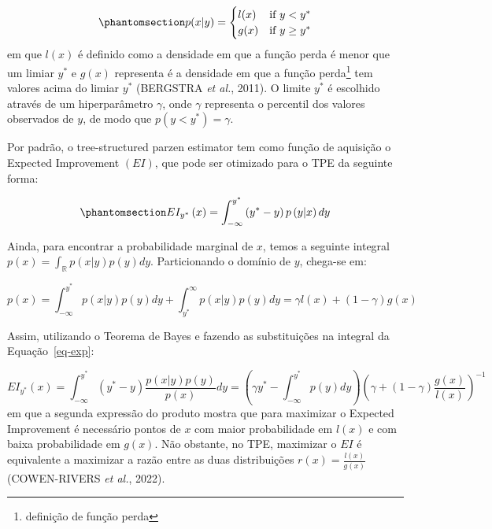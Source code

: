 \documentclass[
  12pt,
  letterpaper,
  DIV=11,
  numbers=noendperiod]{scrreprt}
\begin{document}
\begin{equation}\phantomsection\label{eq-tpe}{
p(x|y) =
\begin{cases}
    l(x) & \text{if } y < y^* \\
    g(x) & \text{if } y \ge y^*
\end{cases}
}\end{equation} em que \(l\left(x\right)\) é definido como a densidade
em que a função perda é menor que um limiar \(y^*\) e
\(g\left(x\right)\) representa é a densidade em que a função
perda\footnote{definição de função perda} tem valores acima do limiar
\(y^*\) (BERGSTRA \emph{et al.}, 2011). O limite \(y^*\) é escolhido
através de um hiperparâmetro \(\gamma\), onde \(\gamma\) representa o
percentil dos valores observados de \(y\), de modo que
\(p\left(y < y^*\right) = \gamma\).

\vspace{12pt}

Por padrão, o tree-structured parzen estimator tem como função de
aquisição o Expected Improvement \(\left(EI\right)\), que pode ser
otimizado para o TPE da seguinte forma:

\begin{equation}\phantomsection\label{eq-exp}{
  EI_{y^*}\left(x\right) = \int_{-\infty}^{y^*} \left(y^* - y\right)p\left(y | x\right) dy
}\end{equation}

Ainda, para encontrar a probabilidade marginal de \(x\), temos a
seguinte integral
\(p\left(x\right) = \int_{\mathbb{R}} p\left(x | y\right)p\left(y\right)dy\).
Particionando o domínio de \(y\), chega-se em:

\[
p\left(x\right) = \int_{-\infty}^{y^*} p\left(x | y\right)p\left(y\right)dy + \int_{y^*}^{\infty} p\left(x | y\right)p\left(y\right)dy = \gamma l\left(x\right) + \left(1 - \gamma \right) g\left(x\right)
\]

Assim, utilizando o Teorema de Bayes e fazendo as substituições na
integral da Equação~\ref{eq-exp}:

\[
EI_{y^*}\left(x\right) = \int_{-\infty}^{y^*} \left(y^* - y\right) \frac{p\left(x | y\right)p\left(y\right)}{p\left(x\right)}dy = \left(\gamma y^*  - \int_{-\infty}^{y^*} p\left(y\right)dy\right) \left(\gamma + \left(1 - \gamma\right)\frac{g\left(x\right)}{l\left(x\right)}\right) ^{-1}
\] em que a segunda expressão do produto mostra que para maximizar o
Expected Improvement é necessário pontos de \(x\) com maior
probabilidade em \(l\left(x\right)\) e com baixa probabilidade em
\(g\left(x\right)\). Não obstante, no TPE, maximizar o \(EI\) é
equivalente a maximizar a razão entre as duas distribuições
\(r\left(x\right) = \frac{l\left(x\right)}{g\left(x\right)}\)
(COWEN-RIVERS \emph{et al.}, 2022).
\end{document}
